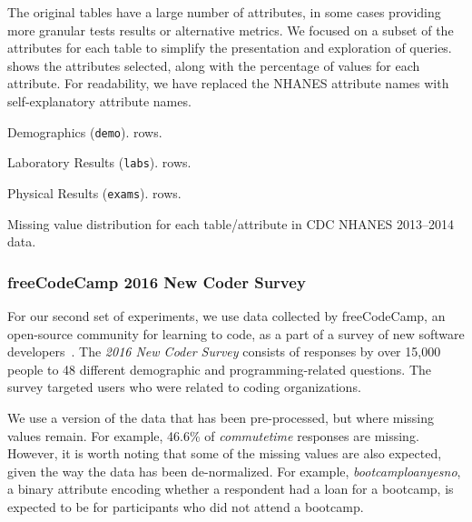 The original tables have a large number of attributes, in some cases providing more granular tests results or alternative metrics.
We focused on a subset of the attributes for each table to simplify the presentation and exploration of queries.
 shows the attributes selected, along with the percentage of \nullv{} values for each attribute.
For readability, we have replaced the NHANES attribute names with self-explanatory attribute names.

\begin{table}
  \centering
  \begin{subtable}{0.5\textwidth}
    \centering
    
    \caption{Demographics (\texttt{demo}). \demorows{} rows.}
  \end{subtable}
  \par\medskip
  \begin{subtable}{0.5\textwidth}
    \centering
    
    \caption{Laboratory Results (\texttt{labs}). \labexrows{} rows.}
  \end{subtable}
  \par\medskip  
  \begin{subtable}{0.5\textwidth}
    \centering
    
    \caption{Physical Results (\texttt{exams}). \labexrows{} rows.}
  \end{subtable}
  \par\medskip  
  \caption{Missing value distribution for each table/attribute in CDC NHANES 2013--2014 data.}\label{table:nhanes-description} 
\end{table}

\subsubsection{freeCodeCamp 2016 New Coder Survey}
For our second set of experiments, we use data collected by freeCodeCamp, an open-source
community for learning to code, as a part of a survey of new software
developers~\cite{fcc-data}.  The \textit{2016 New Coder Survey} consists of responses by
over 15,000 people to 48 different demographic and programming-related questions.  The
survey targeted users who were related to coding organizations.

We use a version of the data that has been pre-processed, but where missing values remain.
For example, 46.6\% of \textit{commutetime} responses are missing. However, it is worth
noting that some of the missing values are also expected, given the way the data has been
de-normalized. For example, \textit{bootcamploanyesno}, a binary attribute encoding whether
a respondent had a loan for a bootcamp, is expected to be \nullv{} for participants who did not
attend a bootcamp.

